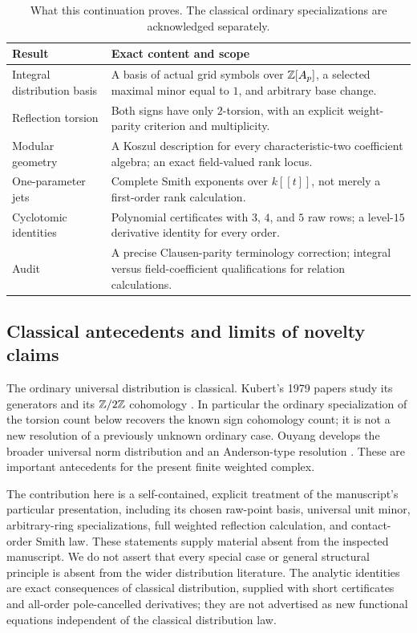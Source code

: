 \begin{table}[ht]
\centering\small
\begin{tabular}{p{}p{}}
\toprule
Result & Exact content and scope\\
\midrule
Integral distribution basis & A basis of actual grid symbols over
$\mathbb Z[A_p]$, a selected maximal minor equal to $1$, and arbitrary base change.\\[4pt]
Reflection torsion & Both signs have only $2$-torsion, with an explicit
weight-parity criterion and multiplicity.\\[4pt]
Modular geometry & A Koszul description for every characteristic-two
coefficient algebra; an exact field-valued rank locus.\\[4pt]
One-parameter jets & Complete Smith exponents over $k[[t]]$, not merely
a first-order rank calculation.\\[4pt]
Cyclotomic identities & Polynomial certificates with $3$, $4$, and $5$
raw rows; a level-$15$ derivative identity for every order.\\[4pt]
Audit & A precise Clausen-parity terminology correction; integral versus
field-coefficient qualifications for relation calculations.\\
\bottomrule
\end{tabular}
\caption{What this continuation proves. The classical ordinary
specializations are acknowledged separately.}\label{ir:tab:claims}
\end{table}

\subsection{Classical antecedents and limits of novelty claims}
The ordinary universal distribution is classical. Kubert's 1979 papers
study its generators and its $\mathbb Z/2\mathbb Z$ cohomology
\cite{kubert-distribution,kubert-sign}. In particular the ordinary
specialization of the torsion count below recovers the known sign
cohomology count; it is not a new resolution of a previously unknown
ordinary case. Ouyang develops the broader universal norm distribution
and an Anderson-type resolution \cite{ouyang}. These are important
antecedents for the present finite weighted complex.

The contribution here is a self-contained, explicit treatment of the
manuscript's particular presentation, including its chosen raw-point
basis, universal unit minor, arbitrary-ring specializations, full weighted
reflection calculation, and contact-order Smith law. These statements
supply material absent from the inspected manuscript. We do not assert
that every special case or general structural principle is absent from
the wider distribution literature. The analytic identities are exact
consequences of classical distribution, supplied with short certificates
and all-order pole-cancelled derivatives; they are not advertised as new
functional equations independent of the classical distribution law.

